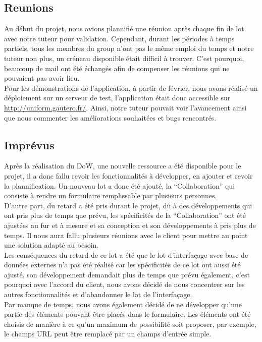 \documentclass{sigplanconf}
\begin{document}
\subsection{Reunions}
Au début du projet, nous avions plannifié une réunion après chaque fin de lot avec notre tuteur pour validation. Cependant, durant les périodes à temps partiels, tous les membres du group n'ont pas le même emploi du temps et notre tuteur non plus, un créneau disponible était difficil à trouver. C'est pourquoi, beaucoup de mail ont été échangés afin de compenser les réunions qui ne pouvaient pas avoir lieu.\\
Pour les démonstrations de l'application, à partir de février, nous avons réalisé un déploiement sur un serveur de test, l'application était donc accessible sur \url{http://uniform.gautero.fr/}. Ainsi, notre tuteur pouvait voir l'avancement ainsi que nous commenter les améliorations souhaitées et bugs rencontrés.

\subsection{Imprévus}
Après la réalisation du DoW, une nouvelle ressource a été disponible pour le projet, il a donc fallu revoir les fonctionnalités à développer, en ajouter et revoir la plannification. Un nouveau lot a donc été ajouté, la ``Collaboration'' qui consiste à rendre un formulaire remplissable par plusieurs personnes.\\
D'autre part, du retard a été pris durant le projet, dû à des développements qui ont pris plus de temps que prévu, les spécificités de la ``Collaboration'' ont été ajustées au fur et à mesure et sa conception et son développements à pris plus de temps. Il nous aura fallu plusieurs réunions avec le client pour mettre au point une solution adapté au besoin.\\
Les conséquences du retard de ce lot a été que le lot d'interfaçage avec base de données externes n'a pas été réalisé car les spécificités de ce lot ont aussi été ajusté, son développement demandait plus de temps que prévu également, c'est pourquoi avec l'accord du client, nous avons décidé de nous concentrer sur les autres fonctionnalités et d'abandonner le lot de l'interfaçage.\\
Par manque de temps, nous avons également décidé de ne développer qu'une partie des éléments pouvant être placés dans le formulaire. Les éléments ont été choisis de manière à ce qu'un maximum de possibilité soit proposer, par exemple, le champs URL peut être remplacé par un champs d'entrée simple.
\end{document}
